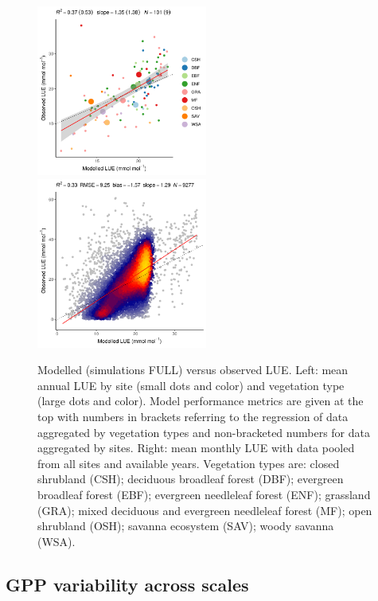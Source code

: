 \documentclass{myreport}
\begin{document}
 \begin{figure}[!ht]
\includegraphics[width=0.5\textwidth]{fig/modobs_lue_bysite_classid.pdf}
\includegraphics[width=0.5\textwidth]{fig/modobs_lue_monthly.pdf}
    \caption{Modelled (simulations FULL) versus observed LUE. Left: mean annual LUE by site (small dots and color) and vegetation type (large dots and color). Model performance metrics are given at the top with numbers in brackets referring to the regression of data aggregated by vegetation types and non-bracketed numbers for data aggregated by sites. Right: mean monthly LUE with data pooled from all sites and available years. Vegetation types are: closed shrubland (CSH); deciduous broadleaf forest (DBF); evergreen broadleaf forest (EBF); evergreen needleleaf forest (ENF); grassland (GRA); mixed deciduous and evergreen needleleaf forest (MF); open shrubland (OSH); savanna ecosystem (SAV); woody savanna (WSA). }
    \label{fig:lue}
\end{figure}


\subsection{GPP variability across scales}
\end{document}
